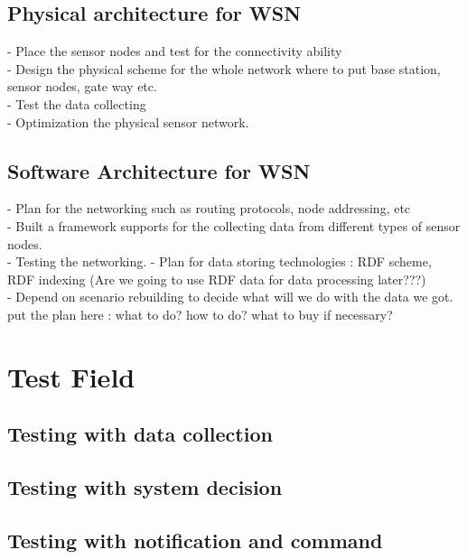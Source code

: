 \documentclass[a4paper, 12pt]{article}
\begin{document}
\subsection{Physical architecture for WSN}
- Place the sensor nodes and test for the connectivity ability\\
- Design the physical scheme for the whole network where to put base station, sensor nodes, gate way etc.\\
- Test the data collecting\\
- Optimization the physical sensor network.
\subsection{Software Architecture for WSN}
- Plan for the networking such as routing protocols, node addressing, etc \\
- Built a framework supports for the collecting data from different types of sensor nodes.\\
- Testing the networking.
- Plan for data storing technologies : RDF scheme, RDF indexing (Are we going to use RDF data for data processing later???)\\ 
- Depend on scenario rebuilding to decide what will we do with the data we got.\\
put the plan here : what to do? how to do? what to buy if necessary?
\section{Test Field}
\subsection{Testing with data collection}
\subsection{Testing with system decision}
\subsection{Testing with notification and command}
\end{document}
